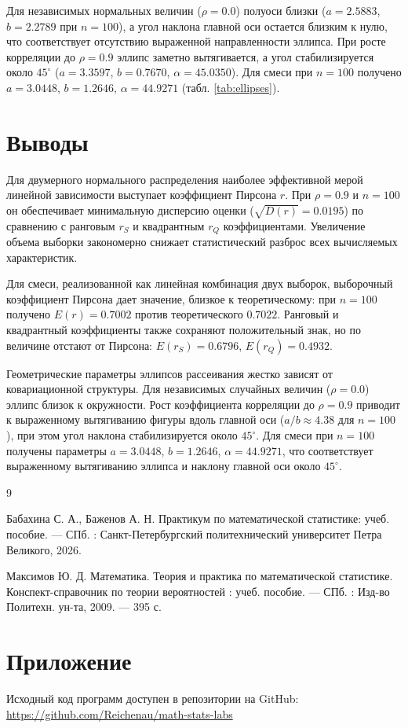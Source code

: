 \documentclass[a4paper, 14pt]{extarticle}
\begin{document}
Для независимых нормальных величин ($\rho=0.0$) полуоси близки ($a=2.5883$, $b=2.2789$ при $n=100$), а угол наклона главной оси остается близким к нулю, что соответствует отсутствию выраженной направленности эллипса. При росте корреляции до $\rho=0.9$ эллипс заметно вытягивается, а угол стабилизируется около $45^\circ$ ($a=3.3597$, $b=0.7670$, $\alpha=45.0350$). Для смеси при $n=100$ получено $a=3.0448$, $b=1.2646$, $\alpha=44.9271$ (табл. \ref{tab:ellipses}).

\section{Выводы}

Для двумерного нормального распределения наиболее эффективной мерой линейной зависимости выступает коэффициент Пирсона $r$. При $\rho=0.9$ и $n=100$ он обеспечивает минимальную дисперсию оценки ($\sqrt{D(r)} = 0.0195$) по сравнению с ранговым $r_S$ и квадрантным $r_Q$ коэффициентами. Увеличение объема выборки закономерно снижает статистический разброс всех вычисляемых характеристик.

Для смеси, реализованной как линейная комбинация двух выборок, выборочный коэффициент Пирсона дает значение, близкое к теоретическому: при $n=100$ получено $E(r)=0.7002$ против теоретического $0.7022$. Ранговый и квадрантный коэффициенты также сохраняют положительный знак, но по величине отстают от Пирсона: $E(r_S)=0.6796$, $E(r_Q)=0.4932$.


Геометрические параметры эллипсов рассеивания жестко зависят от ковариационной структуры. Для независимых случайных величин ($\rho=0.0$) эллипс близок к окружности. Рост коэффициента корреляции до $\rho=0.9$ приводит к выраженному вытягиванию фигуры вдоль главной оси ($a/b \approx 4.38$ для $n=100$), при этом угол наклона стабилизируется около $45^\circ$. Для смеси при $n=100$ получены параметры $a=3.0448$, $b=1.2646$, $\alpha=44.9271$, что соответствует выраженному вытягиванию эллипса и наклону главной оси около $45^\circ$.

\renewcommand{\refname}{\thesection\ Список литературы}

\begin{thebibliography}{9}

    Бабахина С. А., Баженов А. Н. Практикум по математической статистике: учеб. пособие. — СПб. : Санкт-Петербургский политехнический университет Петра Великого, 2026. 

    Максимов Ю. Д. Математика. Теория и практика по математической статистике. Конспект-справочник по теории вероятностей : учеб. пособие. — СПб. : Изд-во Политехн. ун-та, 2009. — 395 с. 

\end{thebibliography}

\section{Приложение}

Исходный код программ доступен в репозитории на GitHub: \\
\url{https://github.com/Reichenau/math-stats-labs}
 
\end{document}

